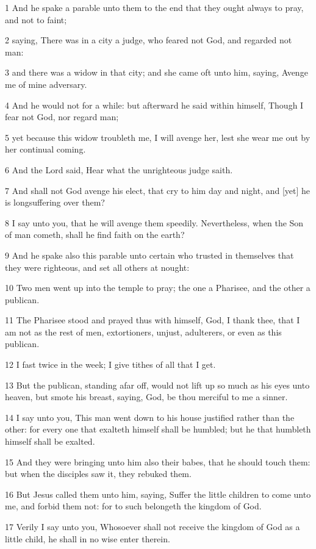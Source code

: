 \par 1 And he spake a parable unto them to the end that they ought always to pray, and not to faint;
\par 2 saying, There was in a city a judge, who feared not God, and regarded not man:
\par 3 and there was a widow in that city; and she came oft unto him, saying, Avenge me of mine adversary.
\par 4 And he would not for a while: but afterward he said within himself, Though I fear not God, nor regard man;
\par 5 yet because this widow troubleth me, I will avenge her, lest she wear me out by her continual coming.
\par 6 And the Lord said, Hear what the unrighteous judge saith.
\par 7 And shall not God avenge his elect, that cry to him day and night, and [yet] he is longsuffering over them?
\par 8 I say unto you, that he will avenge them speedily. Nevertheless, when the Son of man cometh, shall he find faith on the earth?
\par 9 And he spake also this parable unto certain who trusted in themselves that they were righteous, and set all others at nought:
\par 10 Two men went up into the temple to pray; the one a Pharisee, and the other a publican.
\par 11 The Pharisee stood and prayed thus with himself, God, I thank thee, that I am not as the rest of men, extortioners, unjust, adulterers, or even as this publican.
\par 12 I fast twice in the week; I give tithes of all that I get.
\par 13 But the publican, standing afar off, would not lift up so much as his eyes unto heaven, but smote his breast, saying, God, be thou merciful to me a sinner.
\par 14 I say unto you, This man went down to his house justified rather than the other: for every one that exalteth himself shall be humbled; but he that humbleth himself shall be exalted.
\par 15 And they were bringing unto him also their babes, that he should touch them: but when the disciples saw it, they rebuked them.
\par 16 But Jesus called them unto him, saying, Suffer the little children to come unto me, and forbid them not: for to such belongeth the kingdom of God.
\par 17 Verily I say unto you, Whosoever shall not receive the kingdom of God as a little child, he shall in no wise enter therein.
